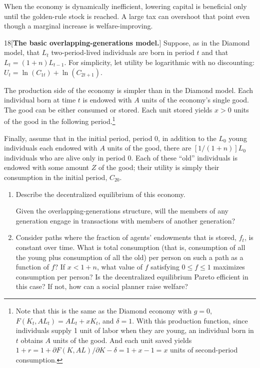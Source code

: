 \begin{note}
    When the economy is dynamically inefficient, lowering capital is
    beneficial only until the golden-rule stock is reached. A large tax can
    overshoot that point even though a marginal increase is welfare-improving.
\end{note}

\begin{problem}{18}[\textbf{The basic overlapping-generations model.}]
Suppose, as in the Diamond model, that \(L_t\) two-period-lived individuals are born in period \(t\) and that \(L_t=\left(1+n\right)L_{t-1}\). For simplicity, let utility be logarithmic with no discounting: \(U_t=\ln\left(C_{1t}\right)+\ln\left(C_{2t+1}\right)\).

The production side of the economy is simpler than in the Diamond model. Each individual born at time \(t\) is endowed with \(A\) units of the economy's single good. The good can be either consumed or stored. Each unit stored yields \(x>0\) units of the good in the following period.\footnote{Note that this is the same as the Diamond economy with \(g=0\), \(F\left(K_t,AL_t\right)=AL_t+xK_t\), and \(\delta=1\). With this production function, since individuals supply 1 unit of labor when they are young, an individual born in \(t\) obtains \(A\) units of the good. And each unit saved yields \(1+r=1+\partial F\left(K,AL\right)/\partial K-\delta=1+x-1=x\) units of second-period consumption.}

Finally, assume that in the initial period, period 0, in addition to the \(L_0\) young individuals each endowed with \(A\) units of the good, there are \(\left[1/\left(1+n\right)\right]L_0\) individuals who are alive only in period 0. Each of these ``old'' individuals is endowed with some amount \(Z\) of the good; their utility is simply their consumption in the initial period, \(C_{20}\).
\begin{enumerate}[label=(\alph*)]
    \item Describe the decentralized equilibrium of this economy. \par {} Given the overlapping-generations structure, will the members of any generation engage in transactions with members of another generation?
    \item Consider paths where the fraction of agents' endowments that is stored, \(f_t\), is constant over time. What is total consumption (that is, consumption of all the young plus consumption of all the old) per person on such a path as a function of \(f\)? If \(x<1+n\), what value of \(f\) satisfying \(0\le f\le1\) maximizes consumption per person? Is the decentralized equilibrium Pareto efficient in this case? If not, how can a social planner raise welfare?
\end{enumerate}
\end{problem}


